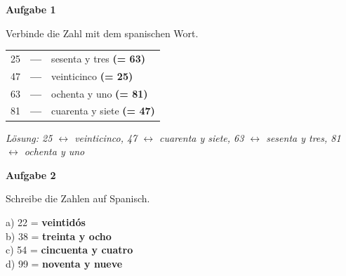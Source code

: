 \documentclass[11pt, a4paper]{article}
\newcommand{\fachfarbe}{spanisch}
\newcommand{\punktebox}[1]{\hfill\fbox{\small \_/#1}}
\newcommand{\loesung}[1]{\textcolor{loesung}{\textbf{#1}}}
\newenvironment{aufgabe}[1]{%
    \needspace{5\baselineskip}%
    \nopagebreak[4]%
    \vspace{10pt}
    \noindent\textbf{\textcolor{\fachfarbe}{Aufgabe #1}}
    \nopagebreak[4]%
    \vspace{5pt}
    \nopagebreak[4]%
    \begin{list}{}{\leftmargin=0pt}
    \item[]
}{%
    \end{list}
}
\begin{document}
\vspace{10pt}


\begin{aufgabe}{1}
Verbinde die Zahl mit dem spanischen Wort. \punktebox{4}
\end{aufgabe}

\begin{center}
\begin{tabular}{rcl}
25 & \loesung{---} & sesenta y tres \loesung{(= 63)} \\[0.8em]
47 & \loesung{---} & veinticinco \loesung{(= 25)} \\[0.8em]
63 & \loesung{---} & ochenta y uno \loesung{(= 81)} \\[0.8em]
81 & \loesung{---} & cuarenta y siete \loesung{(= 47)} \\
\end{tabular}
\end{center}

\textit{\textcolor{grau}{Lösung: 25 $\leftrightarrow$ veinticinco, 47 $\leftrightarrow$ cuarenta y siete, 63 $\leftrightarrow$ sesenta y tres, 81 $\leftrightarrow$ ochenta y uno}}

\vspace{15pt}


\begin{aufgabe}{2}
Schreibe die Zahlen auf Spanisch. \punktebox{4}
\end{aufgabe}

\noindent
a) 22 = \loesung{veintidós} \\[0.8em]
b) 38 = \loesung{treinta y ocho} \\[0.8em]
c) 54 = \loesung{cincuenta y cuatro} \\[0.8em]
d) 99 = \loesung{noventa y nueve} \\

\vspace{15pt}

\end{document}
